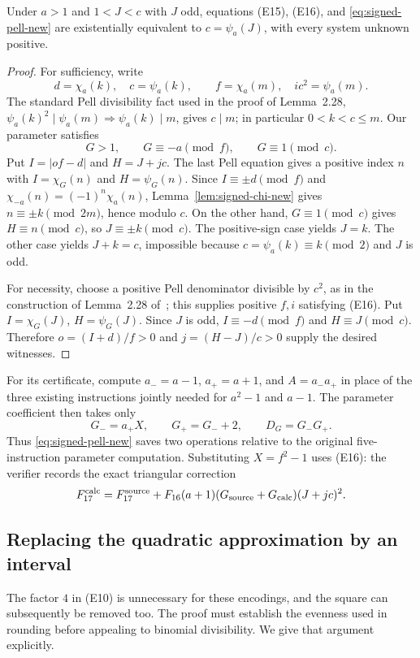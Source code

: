 \begin{proposition}\label{prop:signed-pell-new}\label{lem:signed-pell}
Under $a>1$ and $1<J<c$ with $J$ odd, equations (E15), (E16), and
\eqref{eq:signed-pell-new} are existentially equivalent to
$c=\psi_a(J)$, with every system unknown positive.
\end{proposition}
\begin{proof}
For sufficiency, write
\[
 d=\chi_a(k),\quad c=\psi_a(k),\qquad
 f=\chi_a(m),\quad ic^2=\psi_a(m).
\]
The standard Pell divisibility fact used in the proof of Lemma~2.28,
$\psi_a(k)^2\mid\psi_a(m)\Rightarrow\psi_a(k)\mid m$, gives $c\mid m$;
in particular $0<k<c\le m$. Our parameter satisfies
\[
 G>1,\qquad G\equiv-a\pmod f,\qquad G\equiv1\pmod c.
\]
Put $I=|of-d|$ and $H=J+jc$. The last Pell equation gives a positive
index $n$ with $I=\chi_G(n)$ and $H=\psi_G(n)$. Since
$I\equiv\pm d\pmod f$ and
$\chi_{-a}(n)=(-1)^n\chi_a(n)$, Lemma~\ref{lem:signed-chi-new} gives
$n\equiv\pm k\pmod{2m}$, hence modulo $c$. On the other hand,
$G\equiv1\pmod c$ gives $H\equiv n\pmod c$, so $J\equiv\pm k\pmod c$.
The positive-sign case yields $J=k$. The other case yields $J+k=c$,
impossible because $c=\psi_a(k)\equiv k\pmod2$ and $J$ is odd.

For necessity, choose a positive Pell denominator divisible by $c^2$,
as in the construction of Lemma~2.28 of~\cite{J82}; this supplies positive
$f,i$ satisfying (E16). Put
$I=\chi_G(J)$, $H=\psi_G(J)$. Since $J$ is odd,
$I\equiv-d\pmod f$ and $H\equiv J\pmod c$. Therefore
$o=(I+d)/f>0$ and $j=(H-J)/c>0$ supply the desired witnesses.
\end{proof}

For its certificate, compute $a_-=a-1$, $a_+=a+1$, and
$A=a_-a_+$ in place of the three existing instructions jointly needed
for $a^2-1$ and $a-1$. The parameter coefficient then takes only
\[
 G_-=a_+X,\qquad G_+=G_-+2,\qquad D_G=G_-G_+.
\]
Thus \eqref{eq:signed-pell-new} saves two operations relative to the
original five-instruction parameter computation. Substituting $X=f^2-1$
uses (E16): the verifier records the exact triangular correction
\[
 F_{17}^{\rm calc}=F_{17}^{\rm source}
  +F_{16}(a+1)(G_{\rm source}+G_{\rm calc})(J+jc)^2.
\]

\subsection{Replacing the quadratic approximation by an interval}

The factor $4$ in (E10) is unnecessary for these encodings, and the
square can subsequently be removed too. The proof must establish the
evenness used in rounding before appealing to binomial divisibility.
We give that argument explicitly.

